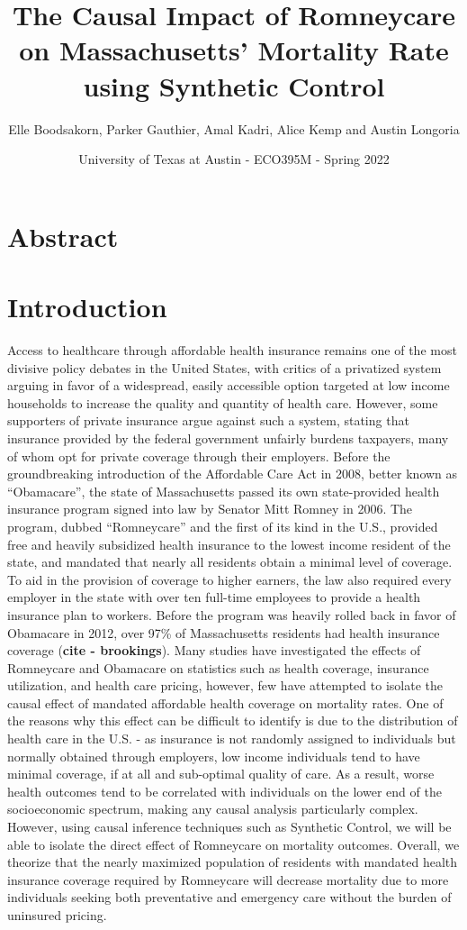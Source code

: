 \documentclass[
]{article}
\title{The Causal Impact of Romneycare on Massachusetts' Mortality Rate
using Synthetic Control}
\author{Elle Boodsakorn, Parker Gauthier, Amal Kadri, Alice Kemp and
Austin Longoria}
\date{University of Texas at Austin - ECO395M - Spring 2022}
\begin{document}
\maketitle

\hypertarget{abstract}{%
\section{Abstract}\label{abstract}}

\newpage

\hypertarget{introduction}{%
\section{Introduction}\label{introduction}}

Access to healthcare through affordable health insurance remains one of
the most divisive policy debates in the United States, with critics of a
privatized system arguing in favor of a widespread, easily accessible
option targeted at low income households to increase the quality and
quantity of health care. However, some supporters of private insurance
argue against such a system, stating that insurance provided by the
federal government unfairly burdens taxpayers, many of whom opt for
private coverage through their employers. Before the groundbreaking
introduction of the Affordable Care Act in 2008, better known as
``Obamacare'', the state of Massachusetts passed its own state-provided
health insurance program signed into law by Senator Mitt Romney in 2006.
The program, dubbed ``Romneycare'' and the first of its kind in the
U.S., provided free and heavily subsidized health insurance to the
lowest income resident of the state, and mandated that nearly all
residents obtain a minimal level of coverage. To aid in the provision of
coverage to higher earners, the law also required every employer in the
state with over ten full-time employees to provide a health insurance
plan to workers. Before the program was heavily rolled back in favor of
Obamacare in 2012, over 97\% of Massachusetts residents had health
insurance coverage (\textbf{cite - brookings}). Many studies have
investigated the effects of Romneycare and Obamacare on statistics such
as health coverage, insurance utilization, and health care pricing,
however, few have attempted to isolate the causal effect of mandated
affordable health coverage on mortality rates. One of the reasons why
this effect can be difficult to identify is due to the distribution of
health care in the U.S. - as insurance is not randomly assigned to
individuals but normally obtained through employers, low income
individuals tend to have minimal coverage, if at all and sub-optimal
quality of care. As a result, worse health outcomes tend to be
correlated with individuals on the lower end of the socioeconomic
spectrum, making any causal analysis particularly complex. However,
using causal inference techniques such as Synthetic Control, we will be
able to isolate the direct effect of Romneycare on mortality outcomes.
Overall, we theorize that the nearly maximized population of residents
with mandated health insurance coverage required by Romneycare will
decrease mortality due to more individuals seeking both preventative and
emergency care without the burden of uninsured pricing.
\end{document}
